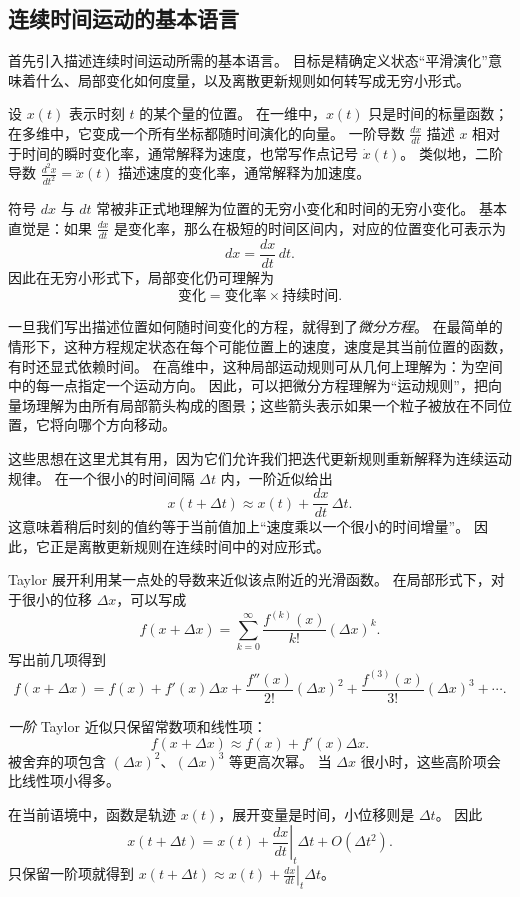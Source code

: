 \subsection{连续时间运动的基本语言}

首先引入描述连续时间运动所需的基本语言。
目标是精确定义状态“平滑演化”意味着什么、局部变化如何度量，以及离散更新规则如何转写成无穷小形式。

设 $x(t)$ 表示时刻 $t$ 的某个量的位置。
在一维中，$x(t)$ 只是时间的标量函数；在多维中，它变成一个所有坐标都随时间演化的向量。
一阶导数 $\frac{dx}{dt}$ 描述 $x$ 相对于时间的瞬时变化率，通常解释为速度，也常写作点记号 $\dot{x}(t)$。
类似地，二阶导数 $\frac{d^2x}{dt^2}=\ddot{x}(t)$ 描述速度的变化率，通常解释为加速度。

符号 $dx$ 与 $dt$ 常被非正式地理解为位置的无穷小变化和时间的无穷小变化。
基本直觉是：如果 $\frac{dx}{dt}$ 是变化率，那么在极短的时间区间内，对应的位置变化可表示为
\[
dx=\frac{dx}{dt}\,dt.
\]
因此在无穷小形式下，局部变化仍可理解为
\[
\text{变化}=\text{变化率}\times\text{持续时间}.
\]

一旦我们写出描述位置如何随时间变化的方程，就得到了\emph{微分方程}。
在最简单的情形下，这种方程规定状态在每个可能位置上的速度，速度是其当前位置的函数，有时还显式依赖时间。
在高维中，这种局部运动规则可从几何上理解为：为空间中的每一点指定一个运动方向。
因此，可以把微分方程理解为“运动规则”，把向量场理解为由所有局部箭头构成的图景；这些箭头表示如果一个粒子被放在不同位置，它将向哪个方向移动。

这些思想在这里尤其有用，因为它们允许我们把迭代更新规则重新解释为连续运动规律。
在一个很小的时间间隔 $\Delta t$ 内，一阶近似给出
\[
x(t+\Delta t)\approx x(t)+\frac{dx}{dt}\,\Delta t.
\]
这意味着稍后时刻的值约等于当前值加上“速度乘以一个很小的时间增量”。
因此，它正是离散更新规则在连续时间中的对应形式。

\begin{tcolorbox}[
  colback=blue!4,
  colframe=blue!50!black,
  title={一阶 Taylor 展开},
  boxrule=0.6pt,
  arc=2mm,
  left=2mm,
  right=2mm,
  top=1mm,
  bottom=1mm
]
Taylor 展开利用某一点处的导数来近似该点附近的光滑函数。
在局部形式下，对于很小的位移 $\Delta x$，可以写成
\[
f(x+\Delta x)
=
\sum_{k=0}^{\infty}
\frac{f^{(k)}(x)}{k!}(\Delta x)^k.
\]
写出前几项得到
\[
f(x+\Delta x)
=
f(x)
+
f'(x)\Delta x
+
\frac{f''(x)}{2!}(\Delta x)^2
+
\frac{f^{(3)}(x)}{3!}(\Delta x)^3
+\cdots.
\]

\emph{一阶} Taylor 近似只保留常数项和线性项：
\[
f(x+\Delta x)
\approx
f(x)+f'(x)\Delta x.
\]
被舍弃的项包含 $(\Delta x)^2$、$(\Delta x)^3$ 等更高次幂。
当 $\Delta x$ 很小时，这些高阶项会比线性项小得多。

在当前语境中，函数是轨迹 $x(t)$，展开变量是时间，小位移则是 $\Delta t$。
因此
\[
x(t+\Delta t)
=
x(t)
+
\left.\frac{dx}{dt}\right|_{t}\Delta t
+
O(\Delta t^2).
\]
只保留一阶项就得到
$x(t+\Delta t)
\approx
x(t)
+
\left.\frac{dx}{dt}\right|_{t}\Delta t$。
\end{tcolorbox}

